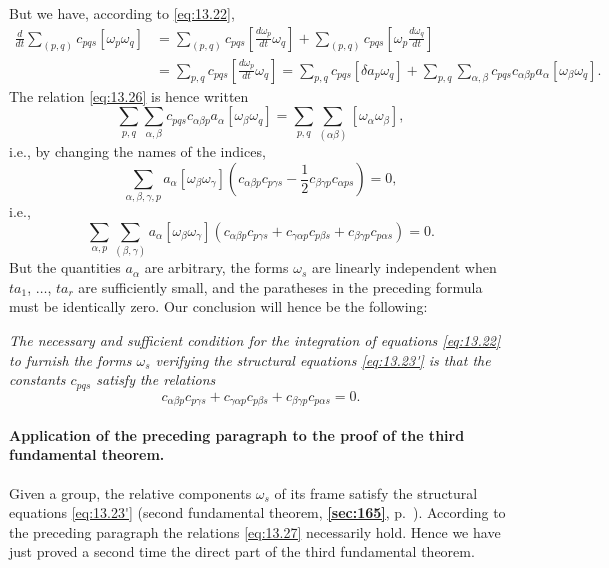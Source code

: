 \documentclass[leqno,11pt]{book}
\numberwithin{equation}{chapter}
\theoremstyle{shape1}
\theoremstyle{shapesmall}
\newcommand{\fsref}[1]{{\rm\textsection\textbf{\ref{sec:#1}}}}
\newcommand{\somespace}{\vspace{9pt}}
\begin{document}
But we have, according to \eqref{eq:13.22},
\begin{align*}
  \frac{d}{dt}\sum_{(p,q)}c_{pqs}[\omega_{p}\omega_{q}]&
  =\sum_{(p,q)}c_{pqs}\left[\frac{d\omega_{p}}{dt}\omega_{q}\right]+\sum_{(p,q)}c_{pqs}\left[\omega_{p}\frac{d\omega_{q}}{dt}\right]\\
  &=\sum_{p,q}c_{pqs}\left[\frac{d\omega_{p}}{dt}\omega_{q}\right]=\sum_{p,q}c_{pqs}[\delta a_{p}\omega_{q}]+\sum_{p,q}\sum_{\alpha,\beta}c_{pqs}c_{\alpha\beta p} a_{\alpha}[\omega_{\beta}\omega_{q}].
\end{align*}
The relation \eqref{eq:13.26} is hence written
\[
\sum_{p,q}\sum_{\alpha,\beta}c_{pqs}c_{\alpha\beta p}a_{\alpha}[\omega_{\beta}\omega_{q}]=\sum_{p,q}\sum_{(\alpha\beta)}[\omega_{\alpha}\omega_{\beta}],
\]
i.e., by changing the names of the indices,
\[
\sum_{\alpha,\beta,\gamma,p}a_{\alpha}[\omega_{\beta}\omega_{\gamma}]\left( c_{\alpha\beta p}c_{p\gamma s}-\frac{1}{2}c_{\beta\gamma p}c_{\alpha{ps}}\right)=0,
\]
i.e.,
\[
\sum_{\alpha,p}\sum_{(\beta,\gamma)}a_{\alpha}[\omega_{\beta}\omega_{\gamma}](c_{\alpha\beta p}c_{p\gamma s}+c_{\gamma\alpha p}c_{p\beta s}+c_{\beta\gamma p}c_{p\alpha s})=0.
\]
But the quantities $a_{\alpha}$ are arbitrary, the forms $\omega_{s}$ are linearly independent when $t a_{1}$, $\dots$, $ta_{r}$ are sufficiently small, and the paratheses in the preceding formula must be identically zero. Our conclusion will hence be the following:

\somespace

\emph{The necessary and sufficient condition for the integration of equations \eqref{eq:13.22} to furnish the forms $\omega_{s}$ verifying the structural equations \eqref{eq:13.23'} is that the constants $c_{pqs}$ satisfy the relations}
\begin{equation}
  \label{eq:13.27}
  c_{\alpha\beta p}c_{p\gamma s}+c_{\gamma\alpha p}c_{p\beta s}+c_{\beta\gamma p}c_{p\alpha s}=0.
\end{equation}

\paragraph{Application of the preceding paragraph to the proof of the third fundamental theorem.}
\label{sec:204}
Given a group, the relative components $\omega_{s}$ of its frame satisfy the structural equations \eqref{eq:13.23'} (second fundamental theorem, \fsref{165}, p.~\pageref{sec:165}). According to the preceding paragraph the relations \eqref{eq:13.27} necessarily hold. Hence we have just proved a second time the direct part of the third fundamental theorem.
\end{document}
